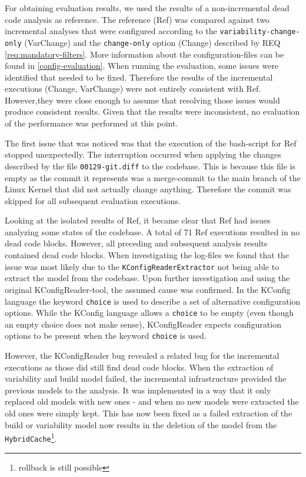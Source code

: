 \documentclass[a4paper]{article}
\begin{document}
For obtaining evaluation results, we used the results of a non-incremental dead code analysis as reference. The reference (Ref) was compared against two incremental analyses that were configured according to the \texttt{variability-change-only} (VarChange) and the \texttt{change-only} option (Change) described by REQ \ref{req:mandatory-filters}. More information about the configuration-files can be found in \autoref{config-evaluation}.
When running the evaluation, some issues were identified that needed to be fixed. Therefore the results of the incremental executions (Change, VarChange) were not entirely consistent with Ref. However,they were close enough to assume that resolving those issues would produce consistent results. Given that the results were inconsistent, no evaluation of the performance was performed at this point.

The first issue that was noticed was that the execution of the bash-script for Ref stopped unexpectedly. The interruption occurred when applying the changes described by the file \texttt{00129-git.diff} to the codebase. This is because this file is empty as the commit it represents was a merge-commit to the main branch of the Linux Kernel that did not actually change anything. Therefore the commit was skipped for all subsequent evaluation executions.

Looking at the isolated results of Ref, it became clear that Ref had issues analyzing some states of the codebase. A total of 71 Ref executions resulted in no dead code blocks. However, all preceding and subsequent analysis results contained dead code blocks. When investigating the log-files we found that the issue was most likely due to the \texttt{KConfigReaderExtractor} not being able to extract the model from the codebase. Upon further investigation and using the original KConfigReader-tool, the assumed cause was confirmed. In the KConfig language the keyword \texttt{choice} is used to describe a set of alternative configuration options. While the KConfig language allows a \texttt{choice} to be empty (even though an empty choice does not make sense), KConfigReader expects configuration options to be present when the keyword \texttt{choice} is used. 

However, the KConfigReader bug revealed a related bug for the incremental executions as those did still find dead code blocks. When the extraction of variability and build model failed, the incremental infrastructure provided the previous models to the analysis. It was implemented in a way that it only replaced old models with new ones - and when no new models were extracted the old ones were simply kept. This has now been fixed as a failed extraction of the build or variability model now results in the deletion of the model from the \texttt{Hybrid\-Cache}\footnote{rollback is still possible}.
\end{document}
